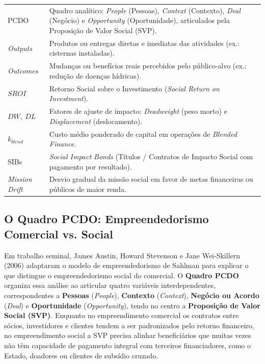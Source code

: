 \begin{boxSimbolo}
\renewcommand{\arraystretch}{1.18}
\begin{tabular}{@{}p{2.4cm} p{12.0cm}@{}}
  PCDO & Quadro analítico: \textit{People} (Pessoas), \textit{Context} (Contexto), \textit{Deal} (Negócio) e \textit{Opportunity} (Oportunidade), articulados pela Proposição de Valor Social (SVP). \\
  \textit{Outputs} & Produtos ou entregas diretas e imediatas das atividades (ex.: cisternas instaladas). \\
  \textit{Outcomes} & Mudanças ou benefícios reais percebidos pelo público-alvo (ex.: redução de doenças hídricas). \\
  $SROI$ & Retorno Social sobre o Investimento (\textit{Social Return on Investment}). \\
  $DW,\ DL$ & Fatores de ajuste de impacto: \textit{Deadweight} (peso morto) e \textit{Displacement} (deslocamento). \\
  $k_{blend}$ & Custo médio ponderado de capital em operações de \textit{Blended Finance}. \\
  SIBs & \textit{Social Impact Bonds} (Títulos / Contratos de Impacto Social com pagamento por resultado). \\
  \textit{Mission Drift} & Desvio gradual da missão social em favor de metas financeiras ou públicos de maior renda. \\
\end{tabular}
\end{boxSimbolo}

\subsection{O Quadro PCDO: Empreendedorismo Comercial vs. Social}

Em trabalho seminal, James Austin, Howard Stevenson e Jane Wei-Skillern (2006) adaptaram o modelo de empreendedorismo de Sahlman para explicar o que distingue o empreendedorismo social do comercial. O \textbf{Quadro PCDO} organiza essa análise ao articular quatro variáveis interdependentes, correspondentes a \textbf{Pessoas} (\textit{People}), \textbf{Contexto} (\textit{Context}), \textbf{Negócio ou Acordo} (\textit{Deal}) e \textbf{Oportunidade} (\textit{Opportunity}), tendo no centro a \textbf{Proposição de Valor Social (SVP)}. Enquanto no empreendimento comercial os contratos entre sócios, investidores e clientes tendem a ser padronizados pelo retorno financeiro, no empreendimento social a SVP precisa alinhar beneficiários que muitas vezes não têm capacidade de pagamento integral com terceiros financiadores, como o Estado, doadores ou clientes de subsídio cruzado.

